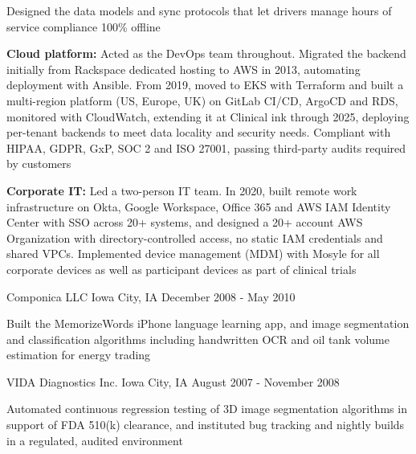 \documentclass{resume}
\begin{document}
\begin{resumeItems}
Designed the data models and sync protocols that let drivers manage hours of service compliance 100\% offline
\item \textbf{Cloud platform:} Acted as the DevOps team throughout.
Migrated the backend initially from Rackspace dedicated hosting to AWS in 2013, automating deployment with Ansible.
From 2019, moved to EKS with Terraform and built a multi-region platform (US, Europe, UK) on GitLab CI/CD, ArgoCD and RDS, monitored with CloudWatch, extending it at Clinical ink through 2025, deploying per-tenant backends to meet data locality and security needs.
Compliant with HIPAA, GDPR, GxP, SOC 2 and ISO 27001, passing third-party audits required by customers
\item \textbf{Corporate IT:} Led a two-person IT team.
In 2020, built remote work infrastructure on Okta, Google Workspace, Office 365 and AWS IAM Identity Center with SSO across 20+ systems, and designed a 20+ account AWS Organization with directory-controlled access, no static IAM credentials and shared VPCs.
Implemented device management (MDM) with Mosyle for all corporate devices as well as participant devices as part of clinical trials
\end{resumeItems}

            {Componica LLC}
            {Iowa City, IA}
            {December 2008 - May 2010}
\begin{resumeItems}
\item Built the MemorizeWords iPhone language learning app, and image segmentation and classification algorithms including handwritten OCR and oil tank volume estimation for energy trading
\end{resumeItems}

            {VIDA Diagnostics Inc.}
            {Iowa City, IA}
            {August 2007 - November 2008}
\begin{resumeItems}
\item Automated continuous regression testing of 3D image segmentation algorithms in support of FDA 510(k) clearance, and instituted bug tracking and nightly builds in a regulated, audited environment
\end{resumeItems}
\end{document}
